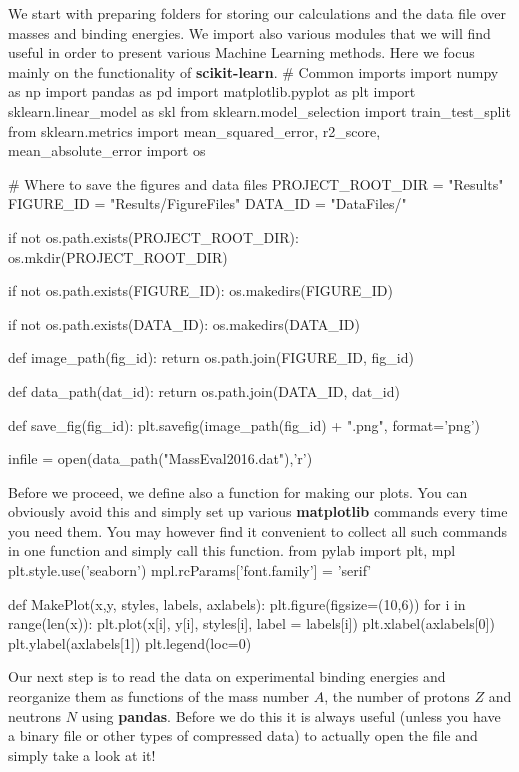 \documentclass[%
oneside,                 %
final,                   %
10pt]{article}
\begin{document}
We start with preparing folders for storing our calculations and the data file over masses and binding energies. We import also various modules that we will find useful in order to present various Machine Learning methods. Here we focus mainly on the functionality of \textbf{scikit-learn}.
\bpycod
# Common imports
import numpy as np
import pandas as pd
import matplotlib.pyplot as plt
import sklearn.linear_model as skl
from sklearn.model_selection import train_test_split
from sklearn.metrics import mean_squared_error, r2_score, mean_absolute_error
import os

# Where to save the figures and data files
PROJECT_ROOT_DIR = "Results"
FIGURE_ID = "Results/FigureFiles"
DATA_ID = "DataFiles/"

if not os.path.exists(PROJECT_ROOT_DIR):
    os.mkdir(PROJECT_ROOT_DIR)

if not os.path.exists(FIGURE_ID):
    os.makedirs(FIGURE_ID)

if not os.path.exists(DATA_ID):
    os.makedirs(DATA_ID)

def image_path(fig_id):
    return os.path.join(FIGURE_ID, fig_id)

def data_path(dat_id):
    return os.path.join(DATA_ID, dat_id)

def save_fig(fig_id):
    plt.savefig(image_path(fig_id) + ".png", format='png')

infile = open(data_path("MassEval2016.dat"),'r')
\epycod


Before we proceed, we define also a function for making our plots. You can obviously avoid this and simply set up various \textbf{matplotlib} commands every time you need them. You may however find it convenient to collect all such commands in one function and simply call this function. 
\bpycod
from pylab import plt, mpl
plt.style.use('seaborn')
mpl.rcParams['font.family'] = 'serif'

def MakePlot(x,y, styles, labels, axlabels):
    plt.figure(figsize=(10,6))
    for i in range(len(x)):
        plt.plot(x[i], y[i], styles[i], label = labels[i])
        plt.xlabel(axlabels[0])
        plt.ylabel(axlabels[1])
    plt.legend(loc=0)
\epycod

Our next step is to read the data on experimental binding energies and
reorganize them as functions of the mass number $A$, the number of
protons $Z$ and neutrons $N$ using \textbf{pandas}.  Before we do this it is
always useful (unless you have a binary file or other types of compressed
data) to actually open the file and simply take a look at it!
\end{document}
